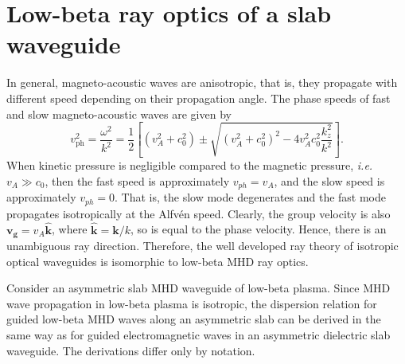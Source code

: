 	
	\section{Low-beta ray optics of a slab waveguide}
	\label{sec: low beta}
	
	In general, magneto-acoustic waves are anisotropic, that is, they propagate with different speed depending on their propagation angle. The phase speeds of fast and slow magneto-acoustic waves are given by
	\begin{equation}
	v_\mathrm{ph}^2 = \frac{\omega^2}{k^2} = \frac{1}{2}\left[ (v_A^2 + c_0^2) \pm \sqrt{(v_A^2 + c_0^2)^2 - 4v_A^2c_0^2\frac{k_z^2}{k^2}} \right]. \label{MHD DR}
	\end{equation}
	When kinetic pressure is negligible compared to the magnetic pressure, \textit{i.e.} $v_A \gg c_0$, then the fast speed is approximately $v_{ph} = v_A$, and the slow speed is approximately $v_{ph} = 0$. That is, the slow mode degenerates and the fast mode propagates isotropically at the Alfv\'{e}n speed. Clearly, the group velocity is also $\mathbf{v_g} = v_A \mathbf{\hat{k}}$, where $\mathbf{\hat{k}} = \mathbf{k}/k$, so is equal to the phase velocity. Hence, there is an unambiguous ray direction. Therefore, the well developed ray theory of isotropic optical waveguides is isomorphic to low-beta MHD ray optics.
	
	Consider an asymmetric slab MHD waveguide of low-beta plasma. Since MHD wave propagation in low-beta plasma is isotropic, the dispersion relation for guided low-beta MHD waves along an asymmetric slab can be derived in the same way as for guided electromagnetic waves in an asymmetric dielectric slab waveguide. The derivations differ only by notation.
	
